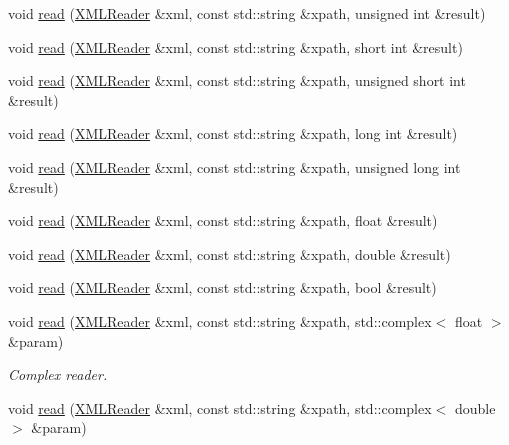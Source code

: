 \begin{DoxyCompactItemize}
\item 
void \mbox{\hyperlink{group__io_ga8237b5b121cf20d4d72ebe0396ad5fc7}{read}} (\mbox{\hyperlink{classADATXML_1_1XMLReader}{X\+M\+L\+Reader}} \&xml, const std\+::string \&xpath, unsigned int \&result)
\item 
void \mbox{\hyperlink{group__io_gac393d0005e4174339c4abaf8a008deac}{read}} (\mbox{\hyperlink{classADATXML_1_1XMLReader}{X\+M\+L\+Reader}} \&xml, const std\+::string \&xpath, short int \&result)
\item 
void \mbox{\hyperlink{group__io_ga8fe4b50be5b1bd3e2bfb094b7c158c06}{read}} (\mbox{\hyperlink{classADATXML_1_1XMLReader}{X\+M\+L\+Reader}} \&xml, const std\+::string \&xpath, unsigned short int \&result)
\item 
void \mbox{\hyperlink{group__io_gac5101b8a4f533a23a99e6ae250648a1d}{read}} (\mbox{\hyperlink{classADATXML_1_1XMLReader}{X\+M\+L\+Reader}} \&xml, const std\+::string \&xpath, long int \&result)
\item 
void \mbox{\hyperlink{group__io_ga91e3d97bb48b2257dba32262f49d5758}{read}} (\mbox{\hyperlink{classADATXML_1_1XMLReader}{X\+M\+L\+Reader}} \&xml, const std\+::string \&xpath, unsigned long int \&result)
\item 
void \mbox{\hyperlink{group__io_ga1a88a7d3e3dbac33c732e580f8c23302}{read}} (\mbox{\hyperlink{classADATXML_1_1XMLReader}{X\+M\+L\+Reader}} \&xml, const std\+::string \&xpath, float \&result)
\item 
void \mbox{\hyperlink{group__io_ga75127d89932656a5224dd747b14ca897}{read}} (\mbox{\hyperlink{classADATXML_1_1XMLReader}{X\+M\+L\+Reader}} \&xml, const std\+::string \&xpath, double \&result)
\item 
void \mbox{\hyperlink{group__io_ga9309cae5bd0340cc4ed71055808b6fac}{read}} (\mbox{\hyperlink{classADATXML_1_1XMLReader}{X\+M\+L\+Reader}} \&xml, const std\+::string \&xpath, bool \&result)
\item 
void \mbox{\hyperlink{group__io_ga1287217ff7c9cbae6a6c958ee2de7776}{read}} (\mbox{\hyperlink{classADATXML_1_1XMLReader}{X\+M\+L\+Reader}} \&xml, const std\+::string \&xpath, std\+::complex$<$ float $>$ \&param)
\begin{DoxyCompactList}\small\item\em Complex reader. \end{DoxyCompactList}\item 
void \mbox{\hyperlink{group__io_gaf79f2861a8d55a3e88311959e646b0e1}{read}} (\mbox{\hyperlink{classADATXML_1_1XMLReader}{X\+M\+L\+Reader}} \&xml, const std\+::string \&xpath, std\+::complex$<$ double $>$ \&param)

\end{DoxyCompactItemize}
